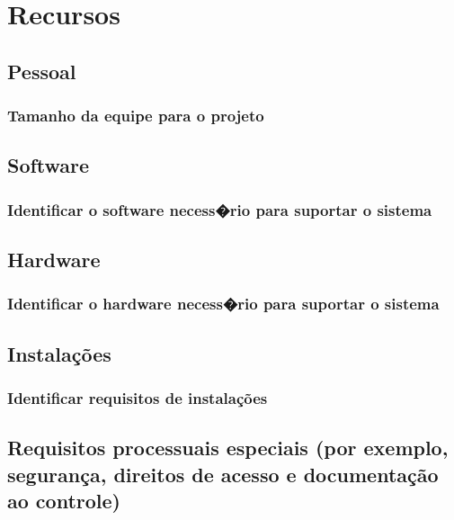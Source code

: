 \chapter{Recursos}

\section{Pessoal}

\subsection{Tamanho da equipe para o projeto }

\section{Software}

\subsection{Identificar o software necess�rio para suportar o sistema}

\section{Hardware}

\subsection{Identificar o hardware necess�rio para suportar o sistema}

\section{Instalações}

\subsection{Identificar requisitos de instalações}

\section{Requisitos processuais especiais (por exemplo, segurança, direitos de acesso e documentação ao controle)}

